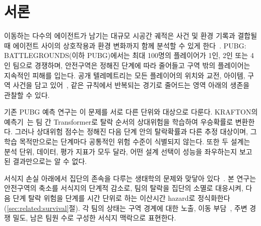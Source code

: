 \section{서론}
\label{sec:introduction}

이동하는 다수의 에이전트가 남기는 대규모 시공간 궤적은 사건 및 환경 기록과 결합될 때 에이전트 사이의 상호작용과 환경 변화까지 함께 분석할 수 있게 한다~\cite{Zheng15}.
PUBG: BATTLEGROUNDS(이하 PUBG)에서는 최대 100명의 플레이어가 1인, 2인 또는 4인 팀으로 경쟁하며, 안전구역은 정해진 단계에 따라 줄어들고 구역 밖의 플레이어는 지속적인 피해를 입는다.
공개 텔레메트리는 모든 플레이어의 위치와 교전, 아이템, 구역 사건을 담고 있어~\cite{PUBGAPI}, 같은 규칙에서 반복되는 경기로 줄어드는 영역 아래의 생존을 관찰할 수 있다.

기존 PUBG 예측 연구는 이 문제를 서로 다른 단위와 대상으로 다룬다.
 KRAFTON의 예측기~\cite{KRAFTON}는 팀 간 Transformer로 탈락 순서의 상대위험을 학습하여 우승확률로 변환한다.
그러나 상대위험 점수는 정해진 다음 단계 안의 탈락확률과 다른 추정 대상이며, 그 학습 목적만으로는 단계마다 공통적인 위험 수준이 식별되지 않는다.
또한 두 설계는 분석 단위, 데이터, 평가 지표가 모두 달라, 어떤 설계 선택이 성능을 좌우하는지 보고된 결과만으로는 알 수 없다.

 서식지 손실 아래에서 집단의 존속을 다루는 생태학의 문제와 맞닿아 있다~\cite{Fahrig03}.
본 연구는 안전구역의 축소를 서식지의 단계적 감소로, 팀의 탈락을 집단의 소멸로 대응시켜, 다음 단계 탈락 위험을 단계를 시간 단위로 하는 이산시간 hazard로 정식화한다(\ref{sec:related:survival}절).
각 팀의 상태는 구역 경계에 대한 노출,  이동 부담~\cite{Nathan08}, 주변 경쟁 밀도, 남은 팀원 수로 구성한 서식지 맥락으로 표현한다.

